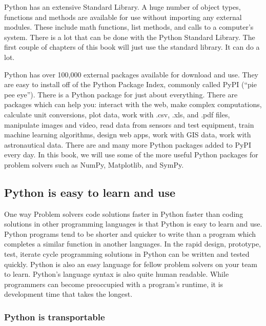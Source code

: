 \documentclass{book}
\begin{document}
Python has an extensive Standard Library. A huge number of object types,
functions and methods are available for use without importing any
external modules. These include math functions, list methods, and calls
to a computer's system. There is a lot that can be done with the Python
Standard Library. The first couple of chapters of this book will just
use the standard library. It can do a lot.

Python has over 100,000 external packages available for download and
use. They are easy to install off of the Python Package Index, commonly
called PyPI (``pie pee eye''). There is a Python package for just about
everything. There are packages which can help you: interact with the
web, make complex computations, calculate unit conversions, plot data,
work with .csv, .xls, and .pdf files, manipulate images and video, read
data from sensors and test equipment, train machine learning algorithms,
design web apps, work with GIS data, work with astronautical data. There
are and many more Python packages added to PyPI every day. In this book,
we will use some of the more useful Python packages for problem solvers
such as NumPy, Matplotlib, and SymPy.
    




    
        \hypertarget{python-is-easy-to-learn-and-use}{%
\subsection{Python is easy to learn and
use}\label{python-is-easy-to-learn-and-use}}

One way Problem solvers code solutions faster in Python faster than
coding solutions in other programming languages is that Python is easy
to learn and use. Python programs tend to be shorter and quicker to
write than a program which completes a similar function in another
languages. In the rapid design, prototype, test, iterate cycle
programming solutions in Python can be written and tested quickly.
Python is also an easy language for fellow problem solvers on your team
to learn. Python's language syntax is also quite human readable. While
programmers can become preoccupied with a program's runtime, it is
development time that takes the longest.

\hypertarget{python-is-transportable}{%
\subsubsection{Python is transportable}\label{python-is-transportable}}
\end{document}
